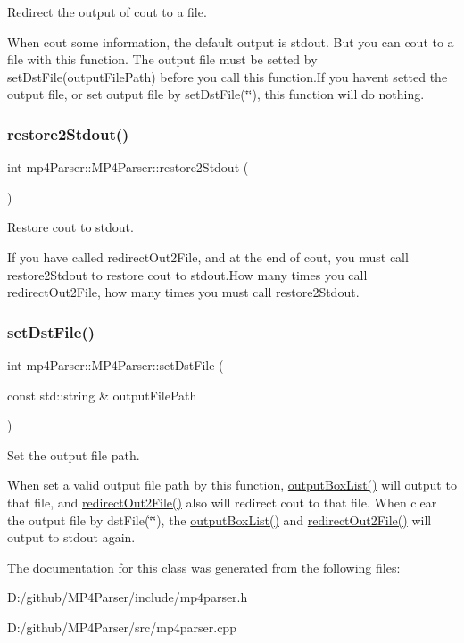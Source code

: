 Redirect the output of cout to a file. 

When cout some information, the default output is stdout. But you can cout to a file with this function. The output file must be setted by set\+Dst\+File(output\+File\+Path) before you call this function.\+If you haven\textquotesingle{}t setted the output file, or set output file by set\+Dst\+File(\char`\"{}\char`\"{}), this function will do nothing. \mbox{\label{classmp4_parser_1_1_m_p4_parser_a7270d8138d1e9c6db3ed4838e5f34ee6}} 
\subsubsection{\texorpdfstring{restore2Stdout()}{restore2Stdout()}}
{\footnotesize\ttfamily int mp4\+Parser\+::\+M\+P4\+Parser\+::restore2\+Stdout (\begin{DoxyParamCaption}{ }\end{DoxyParamCaption})}



Restore cout to stdout. 

If you have called redirect\+Out2\+File, and at the end of cout, you must call restore2\+Stdout to restore cout to stdout.\+How many times you call redirect\+Out2\+File, how many times you must call restore2\+Stdout. \mbox{\label{classmp4_parser_1_1_m_p4_parser_ac5ac99898f7161ebcf828c6f8be2f32a}} 
\subsubsection{\texorpdfstring{setDstFile()}{setDstFile()}}
{\footnotesize\ttfamily int mp4\+Parser\+::\+M\+P4\+Parser\+::set\+Dst\+File (\begin{DoxyParamCaption}\item[{const std\+::string \&}]{output\+File\+Path }\end{DoxyParamCaption})}



Set the output file path. 

When set a valid output file path by this function, \mbox{\hyperlink{classmp4_parser_1_1_m_p4_parser_aded5fb465d00d6a7cdde6fa276615c49}{output\+Box\+List()}} will output to that file, and \mbox{\hyperlink{classmp4_parser_1_1_m_p4_parser_a29f0fc9e2e0c7ed4751e44b8f28092c3}{redirect\+Out2\+File()}} also will redirect cout to that file. When clear the output file by dst\+File(\char`\"{}\char`\"{}), the \mbox{\hyperlink{classmp4_parser_1_1_m_p4_parser_aded5fb465d00d6a7cdde6fa276615c49}{output\+Box\+List()}} and \mbox{\hyperlink{classmp4_parser_1_1_m_p4_parser_a29f0fc9e2e0c7ed4751e44b8f28092c3}{redirect\+Out2\+File()}} will output to stdout again. 

The documentation for this class was generated from the following files\+:\begin{DoxyCompactItemize}
\item 
D\+:/github/\+M\+P4\+Parser/include/mp4parser.\+h\item 
D\+:/github/\+M\+P4\+Parser/src/mp4parser.\+cpp\end{DoxyCompactItemize}
